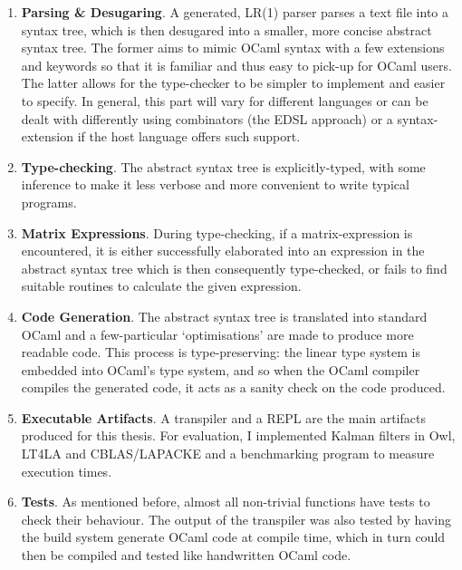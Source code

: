 \begin{enumerate}

    \item \textbf{Parsing \& Desugaring}. A generated, LR(1) parser parses a text
        file into a syntax tree, which is then desugared into a smaller, more
        concise abstract syntax tree. The former aims to mimic OCaml syntax
        with a few extensions and keywords so that it is familiar and thus easy
        to pick-up for OCaml users. The latter allows for the type-checker to
        be simpler to implement and easier to specify. In general, this part
        will vary for different languages or can be dealt with differently
        using combinators (the EDSL approach) or a syntax-extension if the host
        language offers such support.

    \item \textbf{Type-checking}. The abstract syntax tree is explicitly-typed,
        with some inference to make it less verbose and more convenient to
        write typical programs.

    \item \textbf{Matrix Expressions}. During type-checking, if a matrix-expression
        is encountered, it is either successfully elaborated into an expression
        in the abstract syntax tree which is then consequently type-checked, or
        fails to find suitable routines to calculate the given expression.

    \item \textbf{Code Generation}. The abstract syntax tree is translated into
        standard OCaml and a few-particular `optimisations' are made to produce
        more readable code. This process is type-preserving: the linear type
        system is embedded into OCaml's type system, and so when the OCaml compiler
        compiles the generated code, it acts as a sanity check on the code produced.

    \item \textbf{Executable Artifacts}. A transpiler and a REPL are the main
        artifacts produced for this thesis. For evaluation, I implemented
        Kalman filters in Owl, LT4LA and CBLAS/LAPACKE and a benchmarking
        program to measure execution times.

    \item \textbf{Tests}. As mentioned before, almost all non-trivial functions
        have tests to check their behaviour. The output of the transpiler was
        also tested by having the build system generate OCaml code at compile
        time, which in turn could then be compiled and tested like handwritten
        OCaml code.

\end{enumerate}

